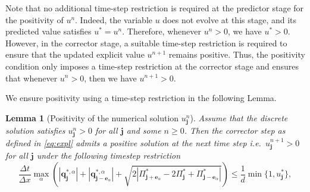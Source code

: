 \documentclass[11pt]{article}
\numberwithin{equation}{section}
\newtheorem{lemma}[theorem]{Lemma}
\newtheorem{counter example}[theorem]{Counter Example}
\numberwithin{equation}{section}
\numberwithin{equation}{section}
\begin{document}
Note that no additional time-step restriction is required at the predictor stage for the positivity of $u^n$. Indeed, the variable $u$ does not evolve at this stage, and its predicted value satisfies $u^*=u^n$. Therefore, whenever $u^{n}>0$, we have $u^{*}>0$. However, in the corrector stage, a suitable time-step restriction is required to ensure that the updated explicit value $u^{n+1}$ remains positive. Thus, the positivity condition only imposes a time-step restriction at the corrector stage and ensures that whenever $u^{n}>0$, then we have $u^{n+1}>0$.

We ensure positivity using a time-step restriction in the following Lemma. 
\begin{lemma}[Positivity of the numerical solution $u_{\mathbf{j}}^n$]
\label{lemma: positivity}
    Assume that the discrete solution satisfies $u^n_\mathbf{j}>0$ for all $\mathbf{j}$ and some $n\geq 0$. Then the corrector step as defined in \eqref{eq:expl} admits a positive solution at the next time step i.e.\ $u_\mathbf{j}^{n+1}>0$ for all $\mathbf{j}$ under the following timestep restriction
\begin{equation}
  \label{eq:suff_tstep_positivity}
\frac{\Delta t}{\Delta x}
\max_\alpha\left(
\left| \mathbf{q}_{\mathbf{j}}^{*,\alpha} \right|
+
\left| \mathbf{q}_{\mathbf{j}-\mathbf{e}_\alpha}^{*,\alpha} \right|
+
\sqrt{2\left|
\Pi_{\mathbf{j}+\mathbf{e}_\alpha}^*
-2\Pi_{\mathbf{j}}^*
+\Pi_{\mathbf{j}-\mathbf{e}_\alpha}^*
\right|}
\right)
\leq
\frac{1}{d}\min\{1, u^*_{\mathbf j}\},
\end{equation}
\end{lemma}
\end{document}
